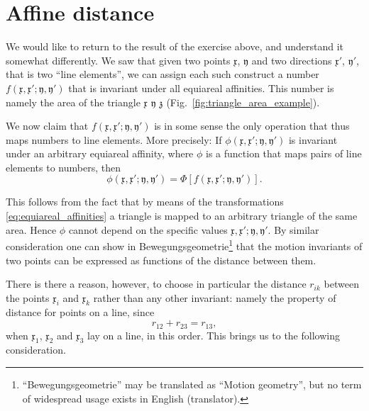 \documentclass[11pt]{book} \usepackage{amssymb}
\newcommand{\myvec}[1]{\mathfrak{#1}}
\newcommand{\vecx}{\myvec{x}}
\newcommand{\vecy}{\myvec{y}}
\begin{document}
\section{Affine distance}

We would like to return to the result of the exercise above, and understand it
somewhat differently. We saw that given two points $\vecx$, $\vecy$
and two directions $\vecx'$, $\vecy'$, that is two ``line elements'', 
we can assign each such construct a number 
$f(\vecx,\vecx';\vecy,\vecy')$ that is invariant under all
equiareal affinities. This number is namely the area of the triangle 
$\vecx$ $\vecy$ $\myvec{z}$ (Fig.~\ref{fig:triangle_area_example}).

We now claim that $f(\vecx,\vecx';\vecy,\vecy')$ is in some
sense the only operation that thus maps numbers to line elements. More 
precisely: If $\phi(\vecx,\vecx';\vecy,\vecy')$ is invariant
under an arbitrary equiareal affinity, where $\phi$ is a function that maps
pairs of line elements to numbers, then
$$ \phi(\vecx,\vecx';\vecy,\vecy') = \Phi\left[f(\vecx,\vecx';\vecy,\vecy')\right].$$

This follows from the fact that by means of the transformations 
\eqref{eq:equiareal_affinities} a triangle is mapped to an arbitrary triangle
of the same area. Hence $\phi$ cannot depend on the specific values
$\vecx,\vecx';\vecy,\vecy'$. By similar consideration one can
show in Bewegungsgeometrie\footnote{``Bewegungsgeometrie'' may be 
translated as
``Motion geometry'', but no term of widespread usage exists in English (translator).} 
that the motion invariants of two points can be 
expressed as functions of the distance between them.

There is there a reason, however, to choose in particular the distance $r_{ik}$
between the points $\vecx_i$ and $\vecx_k$ rather than any other
invariant: namely the property of distance for points on a line, since
$$r_{12}+r_{23}=r_{13},$$
when $\vecx_1$,  $\vecx_2$ and $\vecx_3$ lay on a line, in this 
order. This brings us to the following consideration.
 
\end{document}
